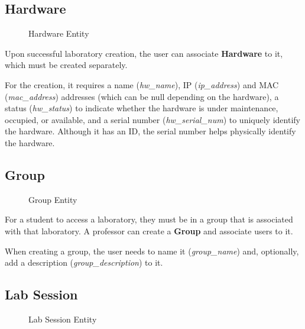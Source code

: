 \subsection*{Hardware}

\begin{figure}[H]
    \centering
    
    \caption{Hardware Entity}
    \label{fig:hardware_entity}
\end{figure}

Upon successful laboratory creation, the user can associate \textbf{Hardware} to it, which must be created separately.

For the creation, it requires a name (\textit{hw\_name}), IP (\textit{ip\_address}) and MAC (\textit{mac\_address}) addresses (which can be null depending on the hardware), a status (\textit{hw\_status}) to indicate whether the hardware is under maintenance, occupied, or available, and a serial number (\textit{hw\_serial\_num}) to uniquely identify the hardware. Although it has an ID, the serial number helps physically identify the hardware.    

\subsection*{Group}

\begin{figure}[H]
    \centering
    
    \caption{Group Entity}
    \label{fig:group_entity}
\end{figure}

For a student to access a laboratory, they must be in a group that is associated with that laboratory. A professor can create a \textbf{Group} and associate users to it.

When creating a group, the user needs to name it (\textit{group\_name}) and, optionally, add a description (\textit{group\_description}) to it.

\subsection*{Lab Session}

\begin{figure}[H]
    \centering
    
    \caption{Lab Session Entity}
    \label{fig:lab_session_entity}
\end{figure}


